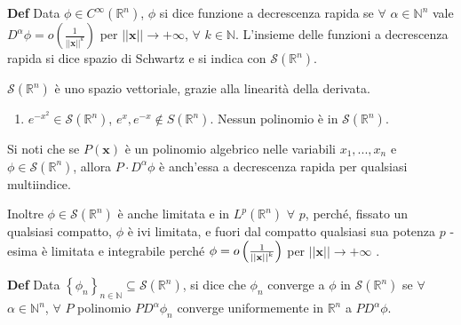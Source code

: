\documentclass{article}
\begin{document}
\textbf{Def} Data $\phi \in C^{\infty }\left( 
\mathbb{R}
^{n}\right) $, $\phi $ si dice funzione a decrescenza rapida se $\forall $ $%
\alpha \in 
\mathbb{N}
^{n}$ vale $D^{\alpha }\phi =o\left( \frac{1}{\left\vert \left\vert \mathbf{x%
}\right\vert \right\vert ^{k}}\right) $ per $\left\vert \left\vert \mathbf{x}%
\right\vert \right\vert \rightarrow +\infty $, $\forall $ $k\in 
\mathbb{N}
$. L'insieme delle funzioni a decrescenza rapida si dice spazio di Schwartz
e si indica con $\mathcal{S}\left( 
\mathbb{R}
^{n}\right) $.

$\mathcal{S}\left( 
\mathbb{R}
^{n}\right) $ \`{e} uno spazio vettoriale, grazie alla linearit\`{a} della
derivata.

\begin{enumerate}
\item $e^{-x^{2}}\in \mathcal{S}\left( 
\mathbb{R}
^{n}\right) $, $e^{x},e^{-x}\not\in S\left( 
\mathbb{R}
^{n}\right) $. Nessun polinomio \`{e} in $\mathcal{S}\left( 
\mathbb{R}
^{n}\right) $.
\end{enumerate}

Si noti che se $P\left( \mathbf{x}\right) $ \`{e} un polinomio algebrico
nelle variabili $x_{1},...,x_{n}$ e $\phi \in \mathcal{S}\left( 
\mathbb{R}
^{n}\right) $, allora $P\cdot D^{\alpha }\phi $ \`{e} anch'essa a
decrescenza rapida per qualsiasi multiindice.

Inoltre $\phi \in \mathcal{S}\left( 
\mathbb{R}
^{n}\right) $ \`{e} anche limitata e in $L^{p}\left( 
\mathbb{R}
^{n}\right) $ $\forall $ $p$, perch\'{e}, fissato un qualsiasi compatto, $%
\phi $ \`{e} ivi limitata, e fuori dal compatto qualsiasi sua potenza $p$%
-esima \`{e} limitata e integrabile perch\'{e} $\phi =o\left( \frac{1}{%
\left\vert \left\vert \mathbf{x}\right\vert \right\vert ^{k}}\right) $ per $%
\left\vert \left\vert \mathbf{x}\right\vert \right\vert \rightarrow +\infty $%
.

\textbf{Def} Data $\left\{ \phi _{n}\right\} _{n\in 
\mathbb{N}
}\subseteq \mathcal{S}\left( 
\mathbb{R}
^{n}\right) $, si dice che $\phi _{n}$ converge a $\phi $ in $\mathcal{S}%
\left( 
\mathbb{R}
^{n}\right) $ se $\forall $ $\alpha \in 
\mathbb{N}
^{n}$, $\forall $ $P$ polinomio $PD^{\alpha }\phi _{n}$ converge
uniformemente in $%
\mathbb{R}
^{n}$ a $PD^{\alpha }\phi $.
\end{document}
